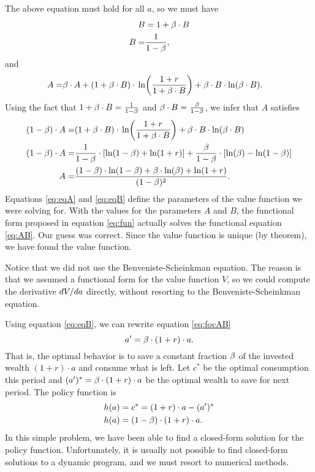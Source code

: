 \documentclass[letterpaper,12pt,leqno]{article}
\begin{document}
The above equation must hold for all $a$, so we must have
\begin{align}
B&=  1+\beta  \cdot B\nonumber\\
B=&\frac{1}{1-\beta}\label{eq:eqB},
\end{align}
and
\begin{align*}
A=&\b \cdot  A+(1+\b \cdot  B)\cdot \ln{\frac{1+r}{1+\b \cdot B}}+\b \cdot  B  \cdot \ln(\b  \cdot B).
\end{align*}
Using the fact that  $1+\beta  \cdot B=\frac{1}{1-\beta}$ and $\beta \cdot  B=\frac{\beta}{1-\beta}$, we infer that $A$ satisfies
\begin{align}
\bp{1-\b}\cdot A=&(1+\b  \cdot B)\cdot \ln{\frac{1+r}{1+\b \cdot B}}+\b\cdot  B\cdot  \ln(\b \cdot  B)\nonumber\\
\bp{1-\b}\cdot  A=&\frac{1}{1-\b}\cdot \bs{\ln(1-\b)+\ln(1+r)}+\frac{\b}{1-\b}\cdot  \bs{\ln(\b)-\ln(1-\b)}\nonumber\\
A=&\frac{(1-\b)\cdot \ln(1-\b)+\b\cdot  \ln(\b)+\ln(1+r)}{(1-\b)^2}\label{eq:eqA}.
\end{align}
Equations \eqref{eq:eqA} and \eqref{eq:eqB} define the parameters of the value function we were solving for. With the values for the parameters $A$ and $B$, the functional form proposed in equation \eqref{eq:fun} actually solves the functional equation \eqref{eq:AB}. Our guess was correct. Since the value function is unique (by theorem), we have found the value function.

Notice that we did not use the Benveniste-Scheinkman equation. The reason is that we assumed a functional form for the value function $V$, so we could compute the derivative  $d V/d a$  directly, without resorting to the Benveniste-Scheinkman equation.

Using equation \eqref{eq:eqB}, we can rewrite equation \eqref{eq:focAB}
\begin{equation*}
a'=\beta  \cdot (1+r)\cdot a.
\end{equation*}
That is, the optimal behavior is to save a constant fraction $\beta$ of the invested wealth $(1+r)\cdot a$ and consume what is left. Let $c^{*}$  be the optimal consumption this period and $(a')^*=\beta \cdot (1+r)\cdot a $  be the optimal wealth to save for next period. The policy function is
\begin{align*}
h(a)&=c^*=(1+r)\cdot a-(a')^*\\
h(a)&=(1-\beta)\cdot  (1+r)\cdot a.
\end{align*}
In this simple problem, we have been able to find a closed-form solution for the policy function. Unfortunately, it is usually not possible to find closed-form solutions to a dynamic program, and we must resort to numerical methods. 
\end{document}
